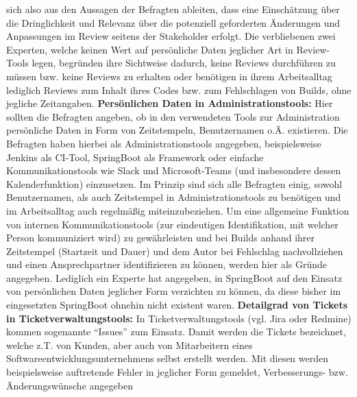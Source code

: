 sich also aus den Aussagen der Befragten ableiten, dass eine Einschätzung über die Dringlichkeit und Relevanz über die potenziell geforderten Änderungen und Anpassungen im Review seitens der Stakeholder erfolgt. \newline
Die verbliebenen zwei Experten, welche keinen Wert auf persönliche Daten jeglicher Art in Review-Tools legen, begründen ihre Sichtweise dadurch, keine Reviews durchführen zu müssen bzw. keine Reviews zu erhalten oder benötigen in ihrem Arbeitsalltag lediglich Reviews zum Inhalt ihres Codes bzw. zum Fehlschlagen von Builds, ohne jegliche Zeitangaben. \newline \newline
\textbf{Persönlichen Daten in Administrationstools:} \newline
Hier sollten die Befragten angeben, ob in den verwendeten Tools zur Administration persönliche Daten in Form von Zeitstempeln, Benutzernamen o.Ä. existieren. Die Befragten haben hierbei als Administrationstools angegeben, beispielsweise Jenkins als CI-Tool, SpringBoot als Framework oder einfache Kommunikationstools wie Slack und Microsoft-Teams (und insbesondere dessen Kalenderfunktion)
einzusetzen. \newline Im Prinzip sind sich alle Befragten einig, sowohl Benutzernamen, als auch Zeitstempel in Administrationstools zu benötigen und im Arbeitsalltag auch regelmäßig miteinzubeziehen. Um eine allgemeine Funktion von internen Kommunikationstools (zur eindeutigen Identifikation, mit welcher Person kommuniziert wird) zu gewährleisten und bei Builds anhand ihrer Zeitstempel (Startzeit und Dauer)
und dem Autor bei Fehlschlag nachvollziehen und einen Ansprechpartner identifizieren zu können, werden hier als Gründe angegeben. Lediglich ein Experte hat angegeben, in SpringBoot auf den Einsatz von persönlichen Daten jeglicher Form verzichten zu können, da diese bisher im eingesetzten SpringBoot ohnehin nicht existent waren. \newline \newline
\textbf{Detailgrad von Tickets in Ticketverwaltungstools:} \newline
In Ticketverwaltungstools (vgl. Jira oder Redmine) kommen sogenannte \enquote{Issues} zum Einsatz. Damit werden die Tickets bezeichnet, welche z.T. von Kunden, aber auch von Mitarbeitern eines Softwareentwicklungsunternehmens selbst erstellt werden. Mit diesen werden beispielsweise auftretende Fehler in jeglicher Form gemeldet, Verbesserungs- bzw. Änderungswünsche angegeben
